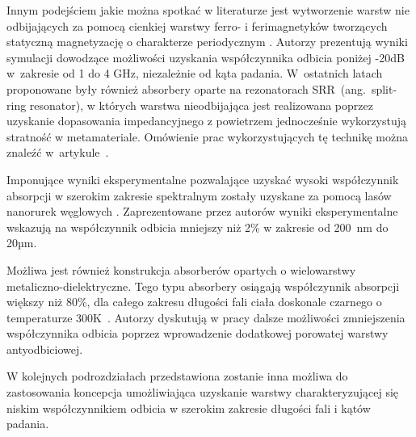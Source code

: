 Innym podejściem jakie można spotkać w literaturze jest wytworzenie warstw nie odbijających za pomocą cienkiej warstwy ferro- i ferimagnetyków tworzących  statyczną magnetyzację o charakterze periodycznym   \cite{ramprecht2008scattering}. Autorzy prezentują wyniki symulacji dowodzące możliwości uzyskania współczynnika odbicia poniżej -20dB w~zakresie od 1 do 4 GHz, niezależnie od kąta padania. W~ostatnich latach proponowane były również absorbery oparte na rezonatorach SRR~(ang.~split-ring resonator), w których warstwa nieodbijająca jest realizowana poprzez uzyskanie dopasowania impedancyjnego z powietrzem jednocześnie wykorzystują stratność w metamateriale. Omówienie prac wykorzystujących tę technikę  można znaleźć w~artykule~\cite{watts2012metamaterial}.

Imponujące wyniki eksperymentalne pozwalające uzyskać wysoki współczynnik absorpcji w szerokim zakresie spektralnym zostały uzyskane za pomocą lasów nanorurek węglowych \cite{mizuno2009black}. Zaprezentowane przez autorów wyniki eksperymentalne wskazują na współczynnik odbicia mniejszy niż 2\% w zakresie od 200~nm do 20µm.

Możliwa jest również konstrukcja absorberów opartych o wielowarstwy metaliczno-dielektryczne. Tego typu absorbery osiągają współczynnik absorpcji większy niż 80\%, dla całego zakresu długości fali ciała doskonale czarnego o temperaturze 300K~\cite{guo2014impact,corrigan2012broadband}. Autorzy dyskutują w pracy dalsze możliwości zmniejszenia współczynnika odbicia poprzez wprowadzenie dodatkowej porowatej warstwy antyodbiciowej. 

W kolejnych podrozdziałach przedstawiona zostanie inna możliwa do zastosowania koncepcja umożliwiająca uzyskanie warstwy charakteryzującej się niskim współczynnikiem odbicia w szerokim zakresie długości fali i kątów padania. 
